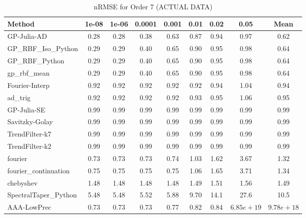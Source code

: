 \begin{table}[htbp]
\centering
\caption{nRMSE for Order 7 (ACTUAL DATA)}
\label{tab:order_7}
\tiny
\begin{tabular}{lcccccccc}
\toprule
\textbf{Method} & \textbf{1e-08} & \textbf{1e-06} & \textbf{0.0001} & \textbf{0.001} & \textbf{0.01} & \textbf{0.02} & \textbf{0.05} & \textbf{Mean} \\
\midrule
GP-Julia-AD & 0.28 & 0.28 & 0.38 & 0.63 & 0.87 & 0.94 & 0.97 & 0.62 \\
GP_RBF_Iso_Python & 0.29 & 0.29 & 0.40 & 0.65 & 0.90 & 0.95 & 0.98 & 0.64 \\
GP_RBF_Python & 0.29 & 0.29 & 0.40 & 0.65 & 0.90 & 0.95 & 0.98 & 0.64 \\
gp_rbf_mean & 0.29 & 0.29 & 0.40 & 0.65 & 0.90 & 0.95 & 0.98 & 0.64 \\
Fourier-Interp & 0.92 & 0.92 & 0.92 & 0.92 & 0.92 & 0.94 & 1.04 & 0.94 \\
ad_trig & 0.92 & 0.92 & 0.92 & 0.92 & 0.93 & 0.95 & 1.06 & 0.95 \\
GP-Julia-SE & 0.99 & 0.99 & 0.99 & 0.99 & 0.99 & 0.99 & 0.99 & 0.99 \\
Savitzky-Golay & 0.99 & 0.99 & 0.99 & 0.99 & 0.99 & 0.99 & 0.99 & 0.99 \\
TrendFilter-k7 & 0.99 & 0.99 & 0.99 & 0.99 & 0.99 & 0.99 & 0.99 & 0.99 \\
TrendFilter-k2 & 0.99 & 0.99 & 0.99 & 0.99 & 0.99 & 0.99 & 0.99 & 0.99 \\
fourier & 0.73 & 0.73 & 0.73 & 0.74 & 1.03 & 1.62 & 3.67 & 1.32 \\
fourier_continuation & 0.75 & 0.75 & 0.75 & 0.75 & 1.06 & 1.65 & 3.71 & 1.34 \\
chebyshev & 1.48 & 1.48 & 1.48 & 1.48 & 1.49 & 1.51 & 1.56 & 1.49 \\
SpectralTaper_Python & 5.48 & 5.48 & 5.52 & 5.88 & 9.70 & 14.1 & 27.6 & 10.5 \\
AAA-LowPrec & 0.73 & 0.73 & 0.73 & 0.77 & 0.82 & 0.84 & $6.85e+19$ & $9.78e+18$ \\
\bottomrule
\end{tabular}
\end{table}
